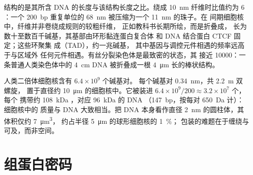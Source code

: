 \begin{proposition}[压缩层次]\label{prop:b3:chromatin-epigenetics:compaction}
结构的\emph{}是其所含
DNA 的长度与该结构长度之比。绕成
\qty{10}{nm} 纤维时比值约为 $6$：一个
\qty{200}{bp} 重复单位的 \qty{68}{nm} 被压缩为一个 \qty{11}{nm} 的珠子。在
间期细胞核中，纤维并非卷绕成规则的较粗纤维，
正如教科书长期所绘，而是折叠成\emph{}，
长为数十至数百千碱基，其基部由环形黏连蛋白复合体
和 DNA 结合蛋白 CTCF 固定；这些环聚集
成\emph{}（TAD），约一兆碱基，
其中基因与调控元件相遇的频率远高于与区域外
任何元件相遇。有丝分裂染色体是最致密的状态，其
接近 \num{10000}：一条普通人类染色体中的 \qty{4}{cm} DNA
被折叠成一根 \qty{4}{\micro m}
长的棒状结构。
\end{proposition}

\begin{example}[十微米内的两米]\label{ex:b3:chromatin-epigenetics:two-metres}
人类二倍体细胞核含有 $6.4\times 10^{9}$ 个碱基对。
每个碱基对 \qty{0.34}{nm}，共 \qty{2.2}{m} 双螺旋，
置于直径约 \qty{10}{\micro m} 的细胞核中。它被装进
$6.4\times 10^{9}/200 \approx 3.2\times 10^{7}$ 个，每个
携带约 \qty{108}{kDa} ，对应 \qty{96}{kDa} 的 DNA
（\qty{147}{bp}，按每对 \qty{650}{Da} 计）：细胞核中的
质量与 DNA 大致相当。把 DNA 本身看作直径
\qty{2}{nm} 的圆柱体，其体积仅约 \qty{7}{\micro m^3}，
约占半径 \qty{5}{\micro m} 的球形细胞核的 \qty{1}{\%}；
包装的难题在于缠绕与可及，而非空间。
\end{example}

\section{组蛋白密码}

